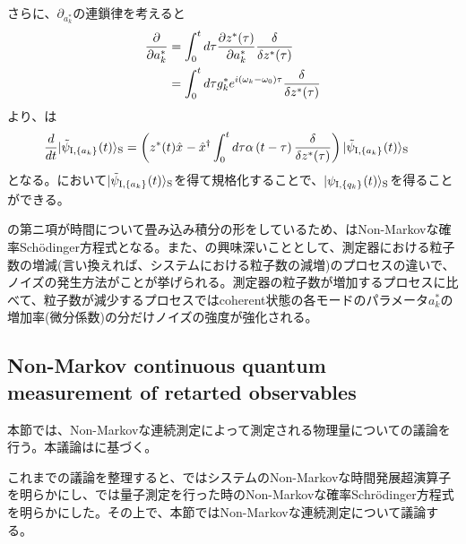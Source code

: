 \documentclass[10pt, a4paper]{jsarticle}
\begin{document}
さらに、$\partial_{a_{k}^{*}}$の連鎖律を考えると
\begin{equation}
\begin{split}
\label{eq:225}
	\dfrac{\partial}{\partial a_{k}^{*}} &= \int_{0}^{t} d\tau \dfrac{\partial z^{*}(\tau)}{\partial a_{k}^{*}} \dfrac{\delta}{\delta z^{*}(\tau)} \\
		&= \int_{0}^{t} d\tau g_{k}^{*} e^{i \left( \omega_{k} - \omega_{0} \right) \tau} \dfrac{\delta}{\delta z^{*}(\tau)}
\end{split}
\end{equation}
より、は
\begin{equation}
\begin{split}
\label{eq:226}
	\dfrac{d}{dt}| \tilde{\psi}_{{\rm I}, \left\{ a_{k} \right\}_{}}(t) \rangle_{\rm S} &= \left( z^{*}(t) \hat{x}_{} - \hat{x}_{}^{\dagger} \int_{0}^{t} d\tau \alpha \left( t - \tau \right) \dfrac{\delta}{\delta z^{*}(\tau)} \right) | \tilde{\psi}_{{\rm I}, \left\{ a_{k} \right\}_{}}(t) \rangle_{\rm S}
\end{split}
\end{equation}
となる。において$| \tilde{\psi}_{{\rm I}, \left\{ a_{k} \right\}_{}}(t) \rangle_{\rm S}$を得て規格化することで、$| \psi_{{\rm I}, \left\{ q_{k} \right\}_{}}(t) \rangle_{\rm S}$を得ることができる。

の第ニ項が時間について畳み込み積分の形をしているため、はNon-Markovな確率Sch\"{o}dinger方程式となる。また、の興味深いこととして、測定器における粒子数の増減(言い換えれば、システムにおける粒子数の減増)のプロセスの違いで、ノイズの発生方法がことが挙げられる。測定器の粒子数が増加するプロセスに比べて、粒子数が減少するプロセスではcoherent状態の各モードのパラメータ$a_{k}^{*}$の増加率(微分係数)の分だけノイズの強度が強化される。


\subsection{Non-Markov continuous quantum measurement of retarted observables}
\label{sec:24}

本節では、Non-Markovな連続測定によって測定される物理量についての議論を行う。本議論は\cite{diosi2008retarted}に基づく。

これまでの議論を整理すると、ではシステムのNon-Markovな時間発展超演算子を明らかにし、では量子測定を行った時のNon-Markovな確率Schr\"{o}dinger方程式を明らかにした。その上で、本節ではNon-Markovな連続測定について議論する。
\end{document}
